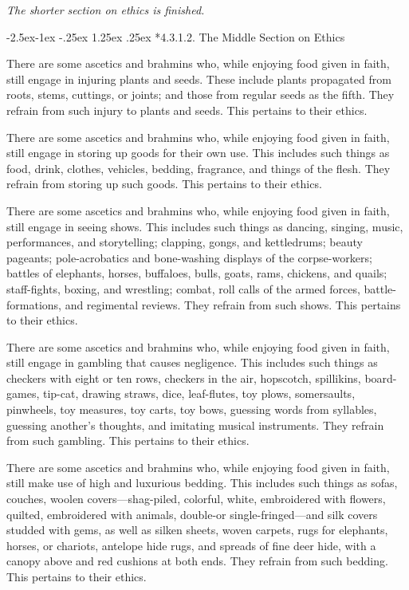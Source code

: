 \documentclass[12pt,openany]{book}%
\makeatletter
\renewcommand\paragraph{\@startsection{paragraph}{4}{\z@}%
            {-2.5ex\@plus -1ex \@minus -.25ex}%
            {1.25ex \@plus .25ex}%
            {\noindent\normalfont\itshape\small}}
\newcommand*{\scendsection}[1]{\begin{Center}\begin{small}\textit{#1}\end{small}\end{Center}\addvspace{1em}}
\makeatother
\begin{document}
\scendsection{The shorter section on ethics is finished. }

\paragraph*{4.3.1.2. The Middle Section on Ethics }

There are some ascetics and brahmins who, while enjoying food given in faith, still engage in injuring plants and seeds. These include plants propagated from roots, stems, cuttings, or joints; and those from regular seeds as the fifth. They refrain from such injury to plants and seeds. This pertains to their ethics. 

There are some ascetics and brahmins who, while enjoying food given in faith, still engage in storing up goods for their own use. This includes such things as food, drink, clothes, vehicles, bedding, fragrance, and things of the flesh. They refrain from storing up such goods. This pertains to their ethics. 

There are some ascetics and brahmins who, while enjoying food given in faith, still engage in seeing shows. This includes such things as dancing, singing, music, performances, and storytelling; clapping, gongs, and kettledrums; beauty pageants; pole-acrobatics and bone-washing displays of the corpse-workers; battles of elephants, horses, buffaloes, bulls, goats, rams, chickens, and quails; staff-fights, boxing, and wrestling; combat, roll calls of the armed forces, battle-formations, and regimental reviews. They refrain from such shows. This pertains to their ethics. 

There are some ascetics and brahmins who, while enjoying food given in faith, still engage in gambling that causes negligence. This includes such things as checkers with eight or ten rows, checkers in the air, hopscotch, spillikins, board-games, tip-cat, drawing straws, dice, leaf-flutes, toy plows, somersaults, pinwheels, toy measures, toy carts, toy bows, guessing words from syllables, guessing another’s thoughts, and imitating musical instruments. They refrain from such gambling. This pertains to their ethics. 

There are some ascetics and brahmins who, while enjoying food given in faith, still make use of high and luxurious bedding. This includes such things as sofas, couches, woolen covers—shag-piled, colorful, white, embroidered with flowers, quilted, embroidered with animals, double-or single-fringed—and silk covers studded with gems, as well as silken sheets, woven carpets, rugs for elephants, horses, or chariots, antelope hide rugs, and spreads of fine deer hide, with a canopy above and red cushions at both ends. They refrain from such bedding. This pertains to their ethics. 
\end{document}
